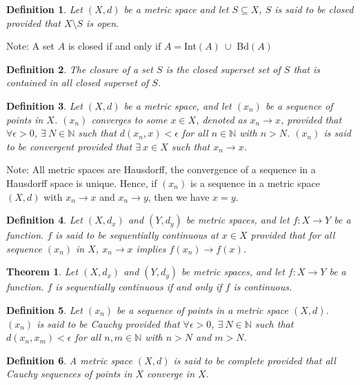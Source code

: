 \documentclass[11pt,oneside]{book}
\theoremstyle{break}
\theoremstyle{break}
\newtheorem{thm}{Theorem}[section]
\newtheorem{defn}{Definition}[corL]
\newcommand{\N}{\mathbb{N}}
\newcommand{\note}{\color{red}Note: \color{black}}
\begin{document}
\begin{defn}
Let $(X,d)$ be a metric space and let $S\subseteq X$, $S$ is said to be closed provided that $X\setminus S$ is open. 
\end{defn}

\note A set $A$ is closed if and only if $A=$Int$(A)\ \cup$ Bd$(A)$

\begin{defn}
The closure of a set $S$ is the closed superset set of $S$ that is contained in all closed superset of $S$.
\end{defn}

\begin{defn}
Let $(X,d)$ be a metric space, and let $(x_n)$ be a sequence of points in $X$. $(x_n)$ converges to some $x\in X$, denoted as $x_n\to x$, provided that $\forall \epsilon>0$, $\exists\ N \in \N$ such that $d(x_n,x)<\epsilon$ for all $n\in \N$ with $n>N$. $(x_n)$ is said to be convergent provided that $\exists\ x \in X$ such that $x_n \to x$. 
\end{defn}
\note All metric spaces are Hausdorff, the convergence of a sequence in a Hausdorff space is unique. Hence, if $(x_n)$ is a sequence in a metric space $(X,d)$ with $x_n \to x$ and $x_n \to y$, then we have $x=y$.

\begin{defn}
Let $(X,d_x)$ and $(Y,d_y)$ be metric spaces, and let $f:X\to Y$ be a function. $f$ is said to be sequentially continuous at $x\in X$ provided that for all sequence $(x_n)$ in $X$, $x_n \to x$ implies $f(x_n) \to f(x)$.
\end{defn}

\begin{thm}
Let $(X,d_x)$ and $(Y,d_y)$ be metric spaces, and let $f:X\to Y$ be a function. $f$ is sequentially continuous if and only if $f$ is continuous.
\end{thm}
\clearpage

\begin{defn}
Let $(x_n)$ be a sequence of points in a metric space $(X,d)$. $(x_n)$ is said to be Cauchy provided that $\forall \epsilon>0$, $\exists\ N \in \N$ such that $d(x_n,x_m)< \epsilon$ for all $n,m\in\N$ with $n>N$ and $m>N$.
\end{defn}

\begin{defn}
A metric space $(X,d)$ is said to be complete provided that all Cauchy sequences of points in $X$ converge in $X$.
\end{defn}
\end{document}
